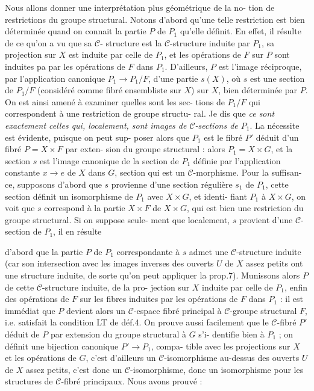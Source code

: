 Nous allons donner une interprétation plus géométrique de la no-
tion de restrictions du groupe structural. Notons d'abord qu'une telle
restriction est bien déterminée quand on connait la partie $P$ de $P_1$
qu'elle définit. En effet, il résulte de ce qu'on a vu que sa $\mathcal{C}$-
structure est la $\mathcal{C}$-structure induite par $P_1$, sa projection sur $X$ est
induite par celle de $P_1$, et les opérations de $F$ sur $P$ sont induites pa
par les opérations de $F$ dans $P_1$. D'ailleurs, $P$ est l'image réciproque,
par l'application canonique $P_1 \to P_1/F$, d'une partie $s(X)$, où $s$ est une
section de $P_1/F$ (considéré comme fibré ensembliste sur $X$) sur $X$, bien
déterminée par $P$. On est ainsi amené à examiner quelles sont les sec-
tions de $P_1/F$ qui correspondent à une restriction de groupe structu-
ral. Je dis que \emph{ce sont exactement celles qui, localement, sont images
de $\mathcal{C}$-sections de $P_1$}. La nécessite est évidente, puisque on peut sup-
poser alors que $P_1$ est le fibré $P'$ déduit d'un fibré $P = X \times F$ par exten-
sion du groupe structural : alors $P_1 = X \times G$, et la section $s$ est l'image
canonique de la section de $P_1$ définie par l'application constante
$x \to e$ de $X$ dans $G$, section qui est un $\mathcal{C}$-morphisme. Pour la suffisan-
ce, supposons d'abord que $s$ provienne d'une section régulière $s_1$ de
$P_1$, cette section définit un isomorphisme de $P_1$ avec $X \times G$, et identi-
fiant $P_1$ à $X \times G$, on voit que $s$ correspond à la partie $X \times F$ de $X \times G$, qui
est bien une restriction du groupe structural. Si on suppose seule-
ment que localement, $s$ provient d'une $\mathcal{C}$-section de $P_1$, il en résulte

\newpage



d'abord que la partie $P$ de $P_1$ correspondante à $s$ admet une $\mathcal{C}$-structure
induite (car son intersection avec les images inverses des ouverts $U$ de
$X$ assez petits ont une structure induite, de sorte qu'on peut appliquer
la prop.7). Munissons alors $P$ de cette $\mathcal{C}$-structure induite, de la pro-
jection sur $X$ induite par celle de $P_1$, enfin des opérations de $F$ sur les
fibres induites par les opérations de $F$ dans $P_1$ : il est immédiat que $P$
devient alors un $\mathcal{C}$-espace fibré principal à $\mathcal{C}$-groupe structural $F$,
i.e. satisfait la condition LT de déf.4. On prouve aussi facilement que
le $\mathcal{C}$-fibré $P'$ déduit de $P$ par extension du groupe structural à $G$ s'i-
dentifie bien à $P_1$ ; on définit une bijection canonique $P' \to P_1$, compa-
tible avec les projections sur $X$ et les opérations de $G$, c'est d'ailleurs
un $\mathcal{C}$-isomorphisme au-dessus des ouverts $U$ de $X$ assez petits, c'est donc
un $\mathcal{C}$-isomorphisme, donc un isomorphisme pour les structures de $\mathcal{C}$-fibré
principaux. Nous avons prouvé :

